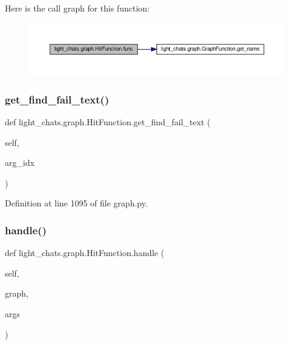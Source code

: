 Here is the call graph for this function\+:
\nopagebreak
\begin{figure}[H]
\begin{center}
\leavevmode
\includegraphics[width=350pt]{classlight__chats_1_1graph_1_1HitFunction_a5154430a7ff1b987446b904c8238eef2_cgraph}
\end{center}
\end{figure}
\mbox{\label{classlight__chats_1_1graph_1_1HitFunction_a3682574dfb01b39b2cec972e8a90d762}} 
\subsubsection{\texorpdfstring{get\+\_\+find\+\_\+fail\+\_\+text()}{get\_find\_fail\_text()}}
{\footnotesize\ttfamily def light\+\_\+chats.\+graph.\+Hit\+Function.\+get\+\_\+find\+\_\+fail\+\_\+text (\begin{DoxyParamCaption}\item[{}]{self,  }\item[{}]{arg\+\_\+idx }\end{DoxyParamCaption})}



Definition at line 1095 of file graph.\+py.

\mbox{\label{classlight__chats_1_1graph_1_1HitFunction_afcc616271cdc3acede3dcabdfe516598}} 
\subsubsection{\texorpdfstring{handle()}{handle()}}
{\footnotesize\ttfamily def light\+\_\+chats.\+graph.\+Hit\+Function.\+handle (\begin{DoxyParamCaption}\item[{}]{self,  }\item[{}]{graph,  }\item[{}]{args }\end{DoxyParamCaption})}



